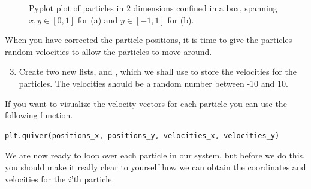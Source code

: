 \documentclass{article}
\begin{document}
\begin{figure}[htb]
  \centering
  \caption{
    Pyplot plot of particles in 2 dimensions confined in a box, spanning $x, y \in [0,1]$ for (a) and $y \in [-1,1]$ for (b).
  }
\end{figure}


\newpage

When you have corrected the particle positions, it is time to give the particles random velocities to allow the particles to move around.

\begin{enumerate}
  \setcounter{enumi}{2}
  \item Create
    two new lists,  and , which we shall use to
    store the velocities for the particles.
    The velocities should be a random number between -10 and 10.
\end{enumerate}

If you want to visualize the velocity vectors for each particle you can use the following function.\\

\begin{lstlisting}
plt.quiver(positions_x, positions_y, velocities_x, velocities_y)
\end{lstlisting}

We are now ready to loop over each particle in our system, but before we do this, you should make it really clear to yourself how we can obtain the coordinates and velocities for the $i$'th particle.
\end{document}
